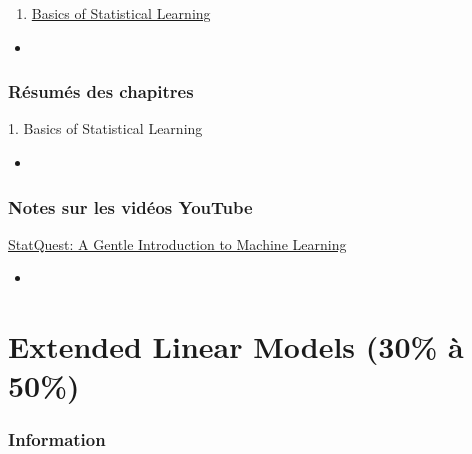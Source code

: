 \documentclass[12pt, titlepage, french]{report}
\begin{document}
\begin{ASM_chapter}
\begin{enumerate}
	\item	\hyperref[BASICS]{Basics of Statistical Learning}
\end{enumerate}
\end{ASM_chapter}

\begin{YTB_vids}
\begin{itemize}
	\item	
\end{itemize}
\end{YTB_vids}

\subsection{Résumés des chapitres}

\begin{CHPT_SUMM}[label = {BASICS}]{1. Basics of Statistical Learning}
	\begin{itemize}
		\item	
	\end{itemize}
\end{CHPT_SUMM}

\subsection{Notes sur les vidéos YouTube}

\begin{YTB_SUMM}[label = {SQ-BASICS-ML-INTRO}]{\href{https://www.youtube.com/watch?v=Gv9_4yMHFhI&list=PLblh5JKOoLUICTaGLRoHQDuF_7q2GfuJF&index=2&t=0s}{StatQuest: A Gentle Introduction to Machine Learning}}
\begin{itemize}
	\item	
\end{itemize}
\end{YTB_SUMM}

\newpage

\chapter[Extended Linear Models]{Extended Linear Models (30\% à 50\%)}

\subsection{Information}
\end{document}
